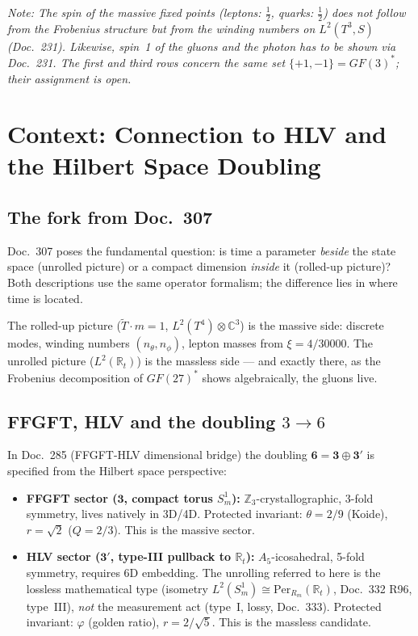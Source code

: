 \noindent\textit{Note: The spin of the massive fixed points (leptons: $\tfrac{1}{2}$,
quarks: $\tfrac{1}{2}$) does not follow from the Frobenius structure but from
the winding numbers on $L^2(T^3,S)$ (Doc.~231). Likewise, spin~1 of the
gluons and the photon has to be shown via Doc.~231. The first and third rows
concern the same set $\{+1,-1\}=GF(3)^*$; their assignment is open.}

\section{Context: Connection to HLV and the Hilbert Space Doubling \KM}

\subsection{The fork from Doc.~307}

Doc.~307 poses the fundamental question: is time a parameter \emph{beside}
the state space (unrolled picture) or a compact dimension \emph{inside} it
(rolled-up picture)? Both descriptions use the same operator formalism; the
difference lies in where time is located.

The rolled-up picture ($\tilde{T}\cdot m=1$, $L^2(T^4)\otimes\mathbb{C}^3$)
is the massive side: discrete modes, winding numbers $(n_\theta,n_\phi)$,
lepton masses from $\xi=4/30000$. The unrolled picture ($L^2(\mathbb{R}_t)$)
is the massless side — and exactly there, as the Frobenius decomposition of
$GF(27)^*$ shows algebraically, the gluons live.

\subsection{FFGFT, HLV and the doubling $3\to6$}

In Doc.~285 (FFGFT-HLV dimensional bridge) the doubling
$\mathbf{6}=\mathbf{3}\oplus\mathbf{3}'$ is specified from the Hilbert space
perspective:

\begin{itemize}
\item \textbf{FFGFT sector ($\mathbf{3}$, compact torus $S^1_m$):}
  $\mathbb{Z}_3$-crystallographic, 3-fold symmetry, lives natively in 3D/4D.
  Protected invariant: $\theta=2/9$ (Koide), $r=\sqrt{2}$ ($Q=2/3$).
  This is the massive sector.
\item \textbf{HLV sector ($\mathbf{3}'$, type-III pullback to $\mathbb{R}_t$):}
  $A_5$-icosahedral, 5-fold symmetry, requires 6D embedding. The unrolling
  referred to here is the lossless mathematical type (isometry
  $L^2(S^1_m)\cong\mathrm{Per}_{R_m}(\mathbb{R}_t)$, Doc.~332 R96, type~III),
  \emph{not} the measurement act (type~I, lossy, Doc.~333). Protected
  invariant: $\varphi$ (golden ratio), $r=2/\sqrt{5}$. This is the
  massless candidate.
\end{itemize}

